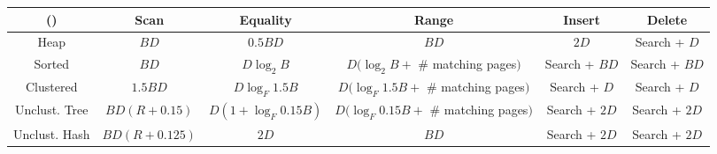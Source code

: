 \documentclass[landscape,8pt]{extarticle}
\begin{document}
\begin{multicols}{4}
\begin{center}
\begin{tabular}{ | c | c | }
        \end{tabular}
    \end{center}
    \begin{center}
        \begin{adjustbox}{angle=270}
            \begin{tabular}{ | c | c | c | c | c | c | } \toprule
                ()            & Scan          & Equality              & Range                                    & Insert        & Delete        \\ \midrule
                Heap          & $BD$          & $0.5 BD$              & $BD$                                     & $2D$          & Search + $D$  \\ \midrule
                Sorted        & $BD$          & $D \log_2 B$          & $D(\log_2 B +$ \# matching pages$)$      & Search + $BD$ & Search + $BD$ \\ \midrule
                Clustered     & $1.5 BD$      & $D \log_F 1.5 B$      & $D(\log_F 1.5B + $ \# matching pages$)$  & Search + $D$  & Search + $D$  \\ \midrule
                Unclust. Tree & $BD(R+0.15)$  & $D(1 + \log_F 0.15B)$ & $D(\log_F 0.15B + $ \# matching pages$)$ & Search + $2D$ & Search + $2D$ \\ \midrule
                Unclust. Hash & $BD(R+0.125)$ & $2D$                  & $BD$                                     & Search + $2D$ & Search + $2D$ \\ \bottomrule
            \end{tabular}
        \end{adjustbox}
    \end{center}
\end{multicols}
\end{document}
